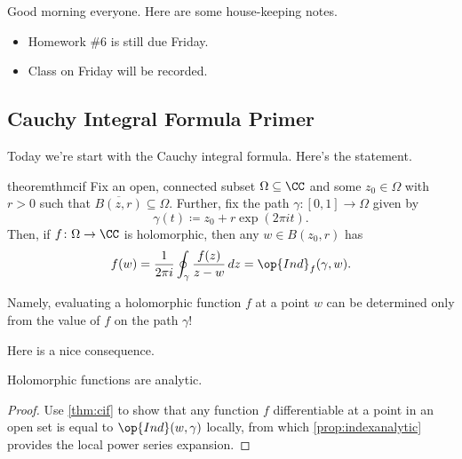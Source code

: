 
Good morning everyone. Here are some house-keeping notes.
\begin{itemize}
	\item Homework \#6 is still due Friday.
	\item Class on Friday will be recorded.
\end{itemize}

\subsection{Cauchy Integral Formula Primer}
Today we're start with the Cauchy integral formula. Here's the statement.
\begin{restatable}{theorem}{thmcif} \label{thm:cif}
	Fix an open, connected subset $\Omega\subseteq\CC$ and some $z_0\in\Omega$ with $r>0$ such that $\overline{B(z,r)}\subseteq\Omega$. Further, fix the path $\gamma\colon [0,1]\to\Omega$ given by
	\[\gamma(t)\coloneqq z_0+r\exp(2\pi it).\]
	Then, if $f\colon \Omega\to\CC$ is holomorphic, then any $w\in B(z_0,r)$ has
	\[f(w)=\frac1{2\pi i}\oint_\gamma\frac{f(z)}{z-w}\,dz=\op{Ind}_f(\gamma,w).\]
\end{restatable}
Namely, evaluating a holomorphic function $f$ at a point $w$ can be determined only from the value of $f$ on the path $\gamma$!

Here is a nice consequence.
\begin{corollary} \label{cor:holoisana}
	Holomorphic functions are analytic.
\end{corollary}
\begin{proof}
	Use \autoref{thm:cif} to show that any function $f$ differentiable at a point in an open set is equal to $\op{Ind}(w,\gamma)$ locally, from which \autoref{prop:indexanalytic} provides the local power series expansion.
\end{proof}

